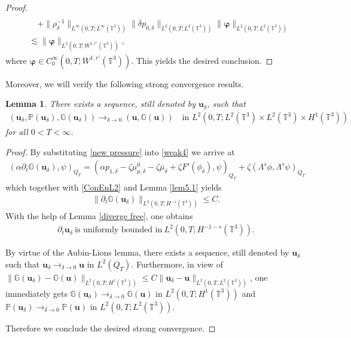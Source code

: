 \documentclass[reqno,a4paper,11pt]{amsart}
\theoremstyle{plain}
\newtheorem{lemma}[theorem]{Lemma}
\numberwithin{equation}{section}
\begin{document}
\begin{proof}
\begin{align}
					\\& \nonumber\quad+\|\rho_{\delta}^{-1}\|_{L^{\infty}(0,T;L^{\infty}(\mathbb{T}^{3}))}\|\delta p_{0,\delta}\|_{L^{2}(0,T;L^{2}(\mathbb{T}^{3}))}\|\boldsymbol{\varphi}\|_{L^{2}(0,T;L^{2}(\mathbb{T}^{3}))}
					\\&\lesssim \|\boldsymbol{\varphi}\|_{L^{2}(0,T;W^{1,r'}(\mathbb{T}^{3}))},
				\end{align}
				where $\boldsymbol{\varphi} \in C_{0}^{\infty}(0,T;W^{1,r'}(\mathbb{T}^{3}))$.
				This yields the desired conclusion.
			\end{proof}
			
			Moreover, we will verify the following strong convergence results.
			\begin{lemma}\label{lem5.3}
				There exists a sequence, still denoted by $\mathbf{u}_{\delta}$, such that
				\begin{align*}
					(\mathbf{u}_{\delta}, \mathbb{P}(\mathbf{u}_{\delta}), \mathbb{G}(\mathbf{u}_{\delta}))\rightarrow_{\delta\rightarrow0}(\mathbf{u},\mathbb{G}(\mathbf{u})) \quad\text{in $L^{2}(0,T;L^{2}(\mathbb{T}^{3})\times L^{2}(\mathbb{T}^{3})\times H^{1}(\mathbb{T}^{3}))$}
				\end{align*}
				for all $0<T<\infty$.
			\end{lemma}
			\begin{proof}
				By substituting \eqref{new pressure} into \eqref{weak4} we arrive at
				\begin{align*}
					(\alpha\partial_{t} \mathbb{G}(\mathbf{u}_{\delta}),\psi)_{Q_{T}}=(\alpha p_{1,\delta}-\zeta\mu_{p,\delta}^{0}-\zeta\overline{\mu}_{\delta}+\zeta F'(\phi_{\delta}),\psi)_{Q_{T}}
					+\zeta(\Lambda^{s}\phi,\Lambda^{s}\psi)_{Q_{T}}
				\end{align*}
				which together with  \eqref{ConEnL2} and Lemma \ref{lem5.1} yields
				\begin{align*}
					\|\partial_{t}\mathbb{G}(\mathbf{u}_{\delta})\|_{L^{2}(0,T;H^{-s}(\mathbb{T}^{3}))}\leq C.
				\end{align*}
				With the help of Lemma \ref{diverge free}, one obtains
				\begin{align}
					\label{eqs:dt-u-delta}
					\partial_{t}\mathbf{u}_{\delta}\ \text{is uniformly bounded in}\ L^{2}(0,T;H^{-1-s}(\mathbb{T}^{3})).
				\end{align}
				
				By virtue of the Aubin-Lions lemma, there exists a sequence, still denoted by $\mathbf{u}_{\delta}$ such that   $\mathbf{u}_{\delta}\rightarrow_{\delta\rightarrow0}\mathbf{u}$ in $L^{2}(Q_{T})$. Furthermore, in view of $\|\mathbb{G}(\mathbf{u}_{\delta})-\mathbb{G}(\mathbf{u})\|_{L^{2}(0,T;H^{1}(\mathbb{T}^{3}))}\leq C \|\mathbf{u}_{\delta}-\mathbf{u}\|_{L^{2}(0,T,L^{2}(\mathbb{T}^{3}))}$, one immediately gets $\mathbb{G}(\mathbf{u}_{\delta})\rightarrow_{\delta\rightarrow0}\mathbb{G}(\mathbf{u})$ in $L^{2}(0,T;H^{1}(\mathbb{T}^{3}))$ and $\mathbb{P}(\mathbf{u}_{\delta})\rightarrow_{\delta\rightarrow0}\mathbb{P}(\mathbf{u})$ in $L^{2}(0,T;L^{2}(\mathbb{T}^{3}))$.
				
				Therefore we conclude  the desired strong convergence.
			\end{proof}
			
\end{document}
